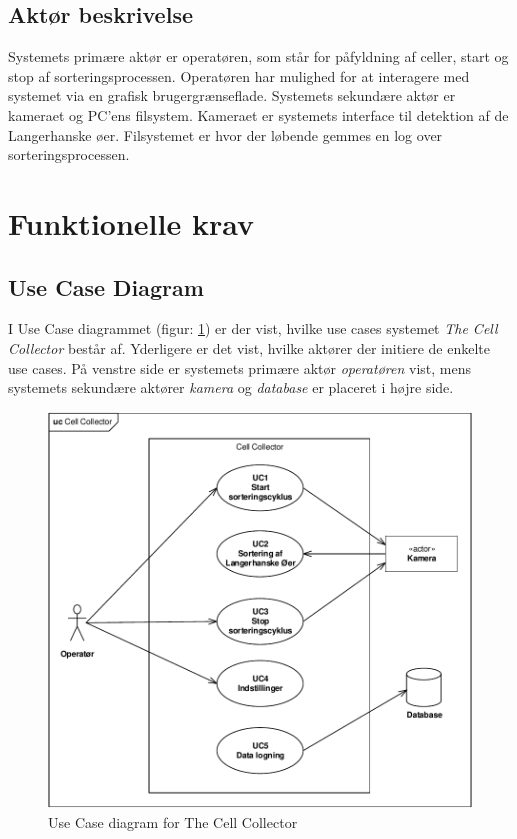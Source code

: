 \subsection{Aktør beskrivelse}
Systemets primære aktør er operatøren, som står for påfyldning af celler, start og stop af sorteringsprocessen. Operatøren har mulighed for at interagere med systemet via en grafisk brugergrænseflade. Systemets sekundære aktør er kameraet og PC’ens filsystem. Kameraet er systemets interface til detektion af de Langerhanske øer. Filsystemet er hvor der løbende gemmes en log over sorteringsprocessen.
\section{Funktionelle krav}

\subsection{Use Case Diagram}
I Use Case diagrammet (figur: \ref{fig:usecase}) er der vist, hvilke use cases systemet \textit{The Cell Collector} består af. Yderligere er det vist, hvilke aktører der initiere de enkelte use cases. På venstre side er systemets primære aktør \textit{operatøren} vist, mens systemets sekundære aktører \textit{kamera} og \textit{database} er placeret i højre side. 

\begin{figure}[H]
	\centering
	\includegraphics[width=1\textwidth]{billeder/UC_CellCollector.pdf}
	\caption{Use Case diagram for The Cell Collector}
	\label{fig:usecase}
\end{figure}
\newpage






